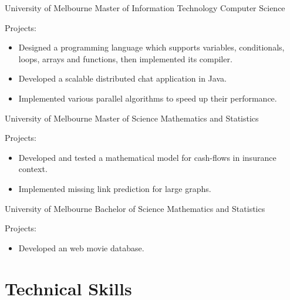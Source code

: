 \documentclass[12pt]{article} %
\begin{document}
\begin{paracol}{2}

	{University of Melbourne}
	{Master of Information Technology} %
	{Computer Science}
	{Projects:
		\begin{itemize}
			\setlength{\itemsep}{1pt}	
			\item Designed a programming language which supports variables, conditionals, loops, arrays and functions, then implemented its compiler.
			\item Developed a scalable distributed chat application in Java.   
			\item Implemented various parallel algorithms to speed up their performance.
		\end{itemize}}
	{University of Melbourne}
	{Master of Science} %
	{Mathematics and Statistics}
	{Projects:
		\begin{itemize}
			\setlength{\itemsep}{1pt}	
			\item Developed and tested a mathematical model for cash-flows in insurance context.
			\item Implemented missing link prediction for large graphs.   
		\end{itemize}}
	{University of Melbourne}
	{Bachelor of Science} %
	{Mathematics and Statistics}
	{Projects:
		\begin{itemize}
			\setlength{\itemsep}{1pt}	
			\item Developed an web movie database.   
		\end{itemize}}



\section{Technical Skills} 


\end{paracol}
\end{document}
